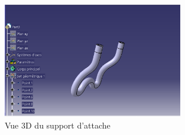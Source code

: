 \documentclass[a4paper,12pt]{report}
\begin{document}
\begin{figure}[H]
    \centering
    \includegraphics[width=0.7\textwidth]{images/support_attache_rouge.png}
    \caption{Vue 3D du support d'attache}
    \label{fig:support}
\end{figure}
\end{document}
